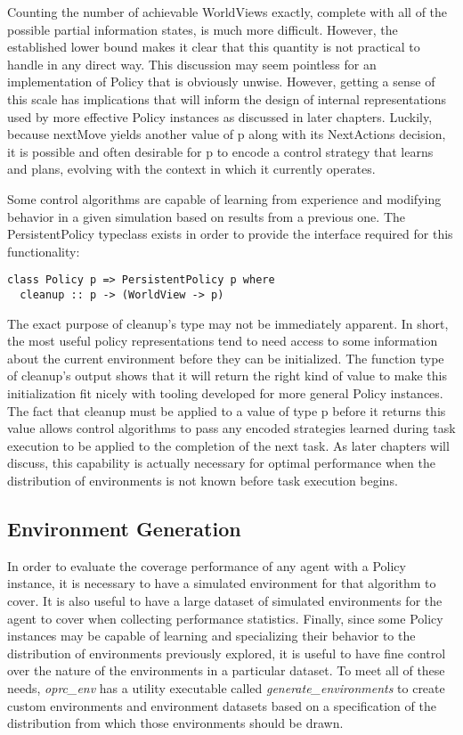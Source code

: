 Counting the number of achievable WorldViews exactly, complete with all of the possible partial information states, is much more difficult. However, the established lower bound makes it clear that this quantity is not practical to handle in any direct way. This discussion may seem pointless for an implementation of Policy that is obviously unwise. However, getting a sense of this scale has implications that will inform the design of internal representations used by more effective Policy instances as discussed in later chapters. Luckily, because nextMove yields another value of p along with its NextActions decision, it is possible and often desirable for p to encode a control strategy that learns and plans, evolving with the context in which it currently operates.

Some control algorithms are capable of learning from experience and modifying behavior in a given simulation based on results from a previous one. The PersistentPolicy typeclass exists in order to provide the interface required for this functionality:

\begin{verbatim}
class Policy p => PersistentPolicy p where
  cleanup :: p -> (WorldView -> p)
\end{verbatim}

The exact purpose of cleanup's type may not be immediately apparent. In short, the most useful policy representations tend to need access to some information about the current environment before they can be initialized. The function type of cleanup's output shows that it will return the right kind of value to make this initialization fit nicely with tooling developed for more general Policy instances. The fact that cleanup must be applied to a value of type p before it returns this value allows control algorithms to pass any encoded strategies learned during task execution to be applied to the completion of the next task. As later chapters will discuss, this capability is actually necessary for optimal performance when the distribution of environments is not known before task execution begins.

\subsection{Environment Generation}

In order to evaluate the coverage performance of any agent with a Policy instance, it is necessary to have a simulated environment for that algorithm to cover. It is also useful to have a large dataset of simulated environments for the agent to cover when collecting performance statistics. Finally, since some Policy instances may be capable of learning and specializing their behavior to the distribution of environments previously explored, it is useful to have fine control over the nature of the environments in a particular dataset. To meet all of these needs, \textit{oprc\_env} has a utility executable called \textit{generate\_environments} to create custom environments and environment datasets based on a specification of the distribution from which those environments should be drawn.

